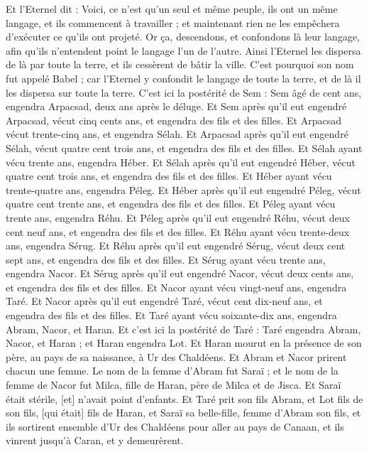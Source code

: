 \begin{multicols}{2}
Et l'Eternel dit : Voici, ce n'est qu'un seul et même peuple, ils ont un même langage, et ils commencent à travailler ; et maintenant rien ne les empêchera d'exécuter ce qu'ils ont projeté.
Or ça, descendons, et confondons là leur langage, afin qu'ils n'entendent point le langage l'un de l'autre.
Ainsi l'Eternel les dispersa de là par toute la terre, et ils cessèrent de bâtir la ville.
C'est pourquoi son nom fut appelé Babel ; car l'Eternel y confondit le langage de toute la terre, et de là il les dispersa sur toute la terre.
C'est ici la postérité de Sem : Sem âgé de cent ans, engendra Arpacsad, deux ans après le déluge.
Et Sem après qu'il eut engendré Arpacsad, vécut cinq cents ans, et engendra des fils et des filles.
Et Arpacsad vécut trente-cinq ans, et engendra Sélah.
Et Arpacsad après qu'il eut engendré Sélah, vécut quatre cent trois ans, et engendra des fils et des filles.
Et Sélah ayant vécu trente ans, engendra Héber.
Et Sélah après qu'il eut engendré Héber, vécut quatre cent trois ans, et engendra des fils et des filles.
Et Héber ayant vécu trente-quatre ans, engendra Péleg.
Et Héber après qu'il eut engendré Péleg, vécut quatre cent trente ans, et engendra des fils et des filles.
Et Péleg ayant vécu trente ans, engendra Réhu.
Et Péleg après qu'il eut engendré Réhu, vécut deux cent neuf ans, et engendra des fils et des filles.
Et Réhu ayant vécu trente-deux ans, engendra Sérug.
Et Réhu après qu'il eut engendré Sérug, vécut deux cent sept ans, et engendra des fils et des filles.
Et Sérug ayant vécu trente ans, engendra Nacor.
Et Sérug après qu'il eut engendré Nacor, vécut deux cents ans, et engendra des fils et des filles.
Et Nacor ayant vécu vingt-neuf ans, engendra Taré.
Et Nacor après qu'il eut engendré Taré, vécut cent dix-neuf ans, et engendra des fils et des filles.
Et Taré ayant vécu soixante-dix ans, engendra Abram, Nacor, et Haran.
Et c'est ici la postérité de Taré : Taré engendra Abram, Nacor, et Haran ; et Haran engendra Lot.
Et Haran mourut en la présence de son père, au pays de sa naissance, à Ur des Chaldéens.
Et Abram et Nacor prirent chacun une femme. Le nom de la femme d'Abram fut Saraï ; et le nom de la femme de Nacor fut Milca, fille de Haran, père de Milca et de Jisca.
Et Saraï était stérile, [et] n'avait point d'enfants.
Et Taré prit son fils Abram, et Lot fils de son fils, [qui était] fils de Haran, et Saraï sa belle-fille, femme d'Abram son fils, et ils sortirent ensemble d'Ur des Chaldéens pour aller au pays de Canaan, et ils vinrent jusqu'à Caran, et y demeurèrent.

\end{multicols}
